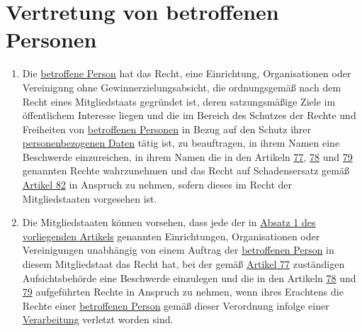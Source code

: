 \chapter{Vertretung von betroffenen Personen}
\label{ch:80}


\begin{enumerate}

  \item Die \hyperref[itm:04-1]{betroffene Person} hat das Recht, eine Einrichtung, Organisationen oder Vereinigung ohne
   Gewinnerzielungsabsicht, die ordnungsgemäß nach dem Recht eines Mitgliedstaats gegründet ist, deren satzungsmäßige
   Ziele im öffentlichem Interesse liegen und die im Bereich des Schutzes der Rechte und Freiheiten von \hyperref[itm:04-1]{betroffenen
   Personen} in Bezug auf den Schutz ihrer \hyperref[itm:04-1]{personenbezogenen Daten} tätig ist, zu beauftragen, in ihrem Namen eine
   Beschwerde einzureichen, in ihrem Namen die in den Artikeln \hyperref[ch:77]{77}, \hyperref[ch:78]{78} und \hyperref
   [ch:79]{79} genannten Rechte wahrzunehmen und das Recht auf Schadensersatz gemäß \hyperref[ch:82]{Artikel 82} in
   Anspruch zu nehmen, sofern dieses im Recht der Mitgliedstaaten vorgesehen ist.
  \label{itm:80-1}

  \item Die Mitgliedstaaten können vorsehen, dass jede der in \hyperref[itm:80-1]{Absatz 1 des vorliegenden Artikels}
   genannten Einrichtungen, Organisationen oder Vereinigungen unabhängig von einem Auftrag der \hyperref[itm:04-1]{betroffenen Person} in
   diesem Mitgliedstaat das Recht hat, bei der gemäß \hyperref[ch:77]{Artikel 77} zuständigen Aufsichtsbehörde eine
   Beschwerde einzulegen und die in den Artikeln \hyperref[ch:78]{78} und \hyperref[ch:79]{79} aufgeführten Rechte in
   Anspruch zu nehmen, wenn ihres Erachtens die Rechte einer \hyperref[itm:04-1]{betroffenen Person} gemäß dieser Verordnung infolge einer
   \hyperref[itm:04-2]{Verarbeitung} verletzt worden sind.
  \label{itm:80-2}

\end{enumerate}


